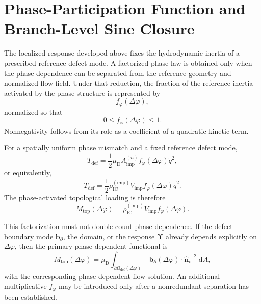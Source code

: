 \section{Phase-Participation Function and Branch-Level Sine Closure}
\label{sec:AP_phase_participation}

The localized response developed above fixes the hydrodynamic inertia of a prescribed reference defect mode. A factorized phase law is obtained only when the phase dependence can be separated from the reference geometry and normalized flow field. Under that reduction, the fraction of the reference inertia activated by the phase structure is represented by
\begin{equation}
    f_{\varphi}(\Delta\varphi),
\end{equation}
normalized so that
\begin{equation}
    0\leq f_{\varphi}(\Delta\varphi)\leq1.
\end{equation}
Nonnegativity follows from its role as a coefficient of a quadratic kinetic term.

For a spatially uniform phase mismatch and a fixed reference defect mode,
\begin{equation}
    T_{\mathrm{def}}
    =
    \frac{1}{2}
    \mu_{\mathrm D}A_{\mathrm{imp}}^{(n)}
    f_{\varphi}(\Delta\varphi)\dot q^2,
\end{equation}
or equivalently,
\begin{equation}
    T_{\mathrm{def}}
    =
    \frac{1}{2}
    \rho_{\mathrm{IC}}^{(\mathrm{imp})}V_{\mathrm{imp}}
    f_{\varphi}(\Delta\varphi)\dot q^2.
\end{equation}
The phase-activated topological loading is therefore
\begin{equation}
    \boxed{
    M_{\mathrm{top}}(\Delta\varphi)
    =
    \rho_{\mathrm{IC}}^{(\mathrm{imp})}V_{\mathrm{imp}}
    f_{\varphi}(\Delta\varphi) }.
\end{equation}

This factorization must not double-count phase dependence. If the defect boundary mode \(\mathbf b_{\partial}\), the domain, or the response \(\boldsymbol\Upsilon\) already depends explicitly on \(\Delta\varphi\), then the primary phase-dependent functional is
\begin{equation}
    M_{\mathrm{top}}(\Delta\varphi)
    =
    \mu_{\mathrm D}
    \int_{\partial\Omega_{\mathrm{def}}(\Delta\varphi)}
    |\mathbf b_{\partial}(\Delta\varphi)\cdot\hat{\mathbf n}_{\mathrm d}|^2
    \;\mathrm dA,
\end{equation}
with the corresponding phase-dependent flow solution. An additional multiplicative \(f_{\varphi}\) may be introduced only after a nonredundant separation has been established.

